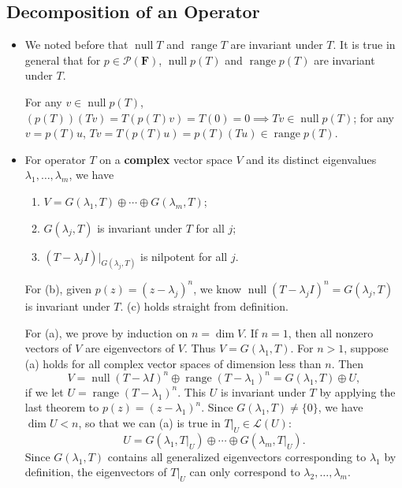 \documentclass[11pt]{article}
\newcommand{\F}{\mathbf{F}}
\newcommand{\n}{\operatorname{null}}
\renewcommand{\r}{\operatorname{range}}
\renewcommand{\d}{\dim}
\newcommand{\PF}{\mathcal{P}(\F)}
\begin{document}
\subsection{Decomposition of an Operator}
\begin{itemize}
    \item We noted before that $\n T$ and $\r T$ are invariant under $T$. It is true in general that for $p \in \PF$, $\n p(T)$ and $\r p(T)$ are invariant under $T$. 
	
    For any $v \in \n p(T)$, $(p(T))(Tv) = T(p(T)v) = T(0) = 0 \implies Tv \in \n p(T)$; for any $v = p(T)u$, $Tv = T(p(T)u) = p(T)(Tu) \in \r p(T)$.
    \item For operator $T$ on a \textbf{complex} vector space $V$ and its distinct eigenvalues $\lambda_1,\dots,\lambda_m$, we have
    \begin{enumerate}[label=(\alph*)]
        \item $V = G(\lambda_1,T) \oplus \cdots \oplus G(\lambda_m,T)$;
	\item $G(\lambda_j,T)$ is invariant under $T$ for all $j$;
	\item $(T-\lambda_j I)|_{G(\lambda_j,T)}$ is nilpotent for all $j$.
    \end{enumerate}
	
    For (b), given $p(z) = (z-\lambda_j)^n$, we know $\n (T - \lambda_j I)^n = G(\lambda_j, T)$ is invariant under $T$. (c) holds straight from definition.
	
    For (a), we prove by induction on $n = \d V$. If $n = 1$, then all nonzero vectors of $V$ are eigenvectors of $V$. Thus $V = G(\lambda_1,T)$. For $n > 1$, suppose (a) holds for all complex vector spaces of dimension less than $n$. Then 
    \begin{equation}
        V = \n (T-\lambda I)^n \oplus \r (T-\lambda_1)^n = G(\lambda_1,T)\oplus U,
    \end{equation}
    if we let $U = \r (T-\lambda_1)^n$. This $U$ is invariant under $T$ by applying the last theorem to $p(z) = (z-\lambda_1)^n$. Since $G(\lambda_1,T) \ne \{0\}$, we have $\d U < n$, so that we can (a) is true in $T|_U \in \mathcal{L}(U)$: \[U = G(\lambda_1,T|_U) \oplus \cdots \oplus G(\lambda_m,T|_U).\] Since $G(\lambda_1,T)$ contains all generalized eigenvectors corresponding to $\lambda_1$ by definition, the eigenvectors of $T|_U$ can only correspond to $\lambda_2,\dots,\lambda_m$.


\end{itemize}
\end{document}
